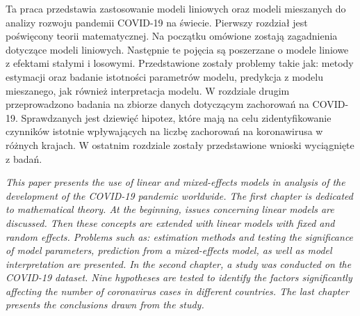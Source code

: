 \documentclass[12pt]{mwbk}
\theoremstyle{plain}
\theoremstyle{definition}
\theoremstyle{definition}
\begin{document}
Ta praca przedstawia zastosowanie modeli liniowych oraz modeli mieszanych do analizy rozwoju pandemii COVID-19 na świecie. Pierwszy rozdział jest poświęcony teorii matematycznej. Na początku omówione zostają zagadnienia dotyczące modeli liniowych. Następnie te pojęcia są poszerzane o modele liniowe z efektami stałymi i losowymi. Przedstawione zostały problemy takie jak: metody estymacji oraz badanie istotności parametrów modelu, predykcja z modelu mieszanego, jak również interpretacja modelu. W rozdziale drugim przeprowadzono badania na zbiorze danych dotyczącym zachorowań na COVID-19. Sprawdzanych jest dziewięć hipotez, które mają na celu zidentyfikowanie czynników istotnie wpływających na liczbę zachorowań na koronawirusa w różnych krajach. W ostatnim rozdziale zostały przedstawione wnioski wyciągnięte z badań.


\bigskip

\begin{center}
  \textbf{\textit{\tytulangielski}}
\end{center}



{\it
This paper presents the use of linear and mixed-effects models in analysis of the development of the COVID-19 pandemic worldwide. The first chapter is dedicated to mathematical theory. At the beginning, issues concerning linear models are discussed. Then these concepts are extended with linear models with fixed and random effects. Problems such as: estimation methods and testing the significance of model parameters, prediction from a mixed-effects model, as well as model interpretation are presented. In the second chapter, a study was conducted on the COVID-19 dataset. Nine hypotheses are tested to identify the factors significantly affecting the number of coronavirus cases in different countries. The last chapter presents the conclusions drawn from the study.

}
\end{document}
